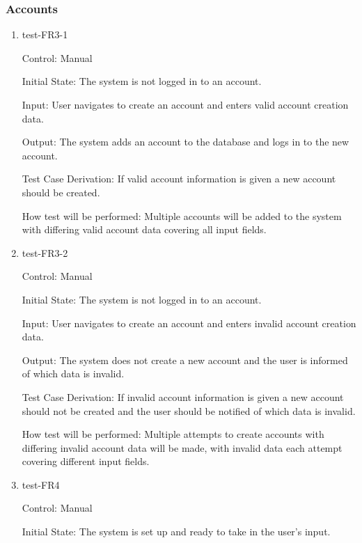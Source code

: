 \documentclass[12pt, titlepage]{article}
\begin{document}
\subsubsection{Accounts}


\begin{enumerate}

  \item{test-FR3-1\\}

  Control: Manual
            
  Initial State: The system is not logged in to an account.
            
  Input: User navigates to create an account and enters valid account creation
  data.
            
  Output: The system adds an account to the database and logs in to the new
  account.
  
  Test Case Derivation: If valid account information is given a new account
  should be created.
  
  How test will be performed: Multiple accounts will be added to the system
  with differing valid account data covering all input fields.

  \item{test-FR3-2\\}

  Control: Manual
            
  Initial State: The system is not logged in to an account.
            
  Input: User navigates to create an account and enters invalid account
  creation data.
            
  Output: The system does not create a new account and the user is informed of
  which data is invalid.
  
  Test Case Derivation: If invalid account information is given a new account
  should not be created and the user should be notified of which data is
  invalid.
  
  How test will be performed: Multiple attempts to create accounts with
  differing invalid account data will be made, with invalid data each attempt
  covering different input fields.

  \item{test-FR4\\}

  Control: Manual
            
  Initial State: The system is set up and ready to take in the user's input.
            

\end{enumerate}
\end{document}
